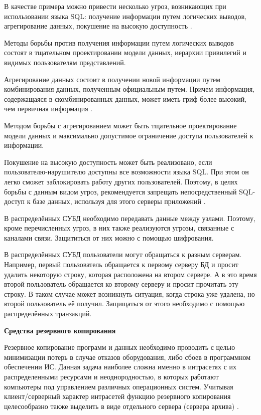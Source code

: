 В качестве примера можно привести несколько угроз, возникающих при использовании языка SQL: получение
информации путем логических выводов, агрегирование данных, покушение на высокую доступность \autocite{DistrDBThreats}.

Методы борьбы против получения информации путем логических выводов состоят в тщательном проектировании
модели данных, иерархии привилегий и видимых пользователям представлений.

Агрегирование данных состоит в получении новой информации путем комбинирования данных, полученным официальным
путем. Причем информация, содержащаяся в скомбинированных данных, может иметь гриф более высокий, чем первичная информация \autocite{DistrDBThreats}.

Методом борьбы с агрегированием может быть тщательное проектирование модели данных и максимально допустимое
ограничение доступа пользователей к информации.

Покушение на высокую доступность может быть реализовано, если пользователю-нарушителю доступны все возможности
языка SQL. При этом он легко сможет заблокировать работу других пользователей. Поэтому, в целях борьбы с данным
видом угроз, рекомендуется запрещать непосредственный SQL-доступ к базе данных, используя для этого серверы приложений \autocite{DistrDBThreats}.

В распределённых СУБД необходимо передавать данные между узлами. 
Поэтому, кроме перечисленных угроз, в них также реализуются угрозы, связанные с каналами связи.
Защититься от них можно с помощью шифрования.

В распределённых СУБД пользователи могут обращаться к разным серверам.
Например, первый пользователь обращается к первому серверу БД и просит удалить некоторую строку, которая расположена на втором сервере.
А в это время второй пользователь обращается ко второму серверу и просит прочитать эту строку.
В таком случае может возникнуть ситуация, когда строка уже удалена, но второй пользователь её получил.
Защищаться от этого необходимо с помощью распределённых транзакций.

\bigbreak
\textbf{Средства резервного копирования}

Резервное копирование программ и данных необходимо проводить с целью минимизации потерь в случае отказов
оборудования, либо сбоев в программном обеспечении ИС. Данная задача наиболее сложна именно в интрасетях
с их распределенными ресурсами и неоднородностью, в которых работают компьютеры под управлением различных
операционных систем. Учитывая клиент/серверный характер интрасетей функцию резервного копирования целесообразно
также выделить в виде отдельного сервера (сервера архива) \autocite{DistrDBThreats}.

